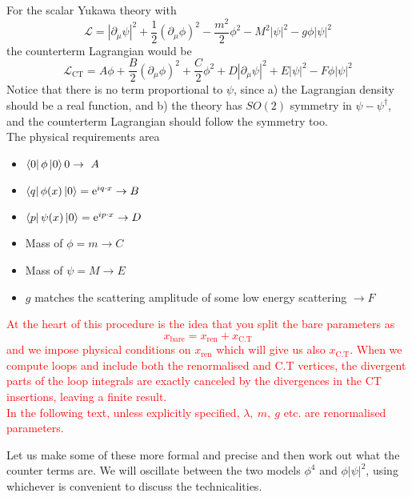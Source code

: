 \documentclass[11pt]{article}
\newcommand{\del}{\partial}
\newcommand{\e}{\mathrm{e}}
\newcommand{\ld}{\mathcal{L}}
\numberwithin{equation}{section}
\begin{document}
For the scalar Yukawa theory with 
\begin{equation*}
    \ld = |\del_\mu \psi|^2 + \frac{1}{2}(\del_\mu \phi)^2 - \frac{m^2}{2}\phi^2 - M^2|\psi|^2 - g\phi|\psi|^2
\end{equation*}
the counterterm Lagrangian would be 
\begin{equation*}
    \ld_{\text{CT}} = A\phi + \frac{B}{2}(\del_\mu \phi)^2 + \frac{C}{2}\phi^2 + D|\del_\mu \psi|^2  + E|\psi|^2 - F\phi|\psi|^2
\end{equation*}
Notice that there is no term proportional to \(\psi\), since a) the Lagrangian density should be a real function, and b) the theory has \(SO(2)\) symmetry in \(\psi-\psi^\dagger\), and the counterterm Lagrangian should follow the symmetry too.\\
The physical requirements area
\begin{itemize}
    \item \(\bra{0}\phi\ket{0} 0 \to~A\)
    \item \(\bra{q}\phi(x)\ket{0} = \e^{iq\cdot x} \to B\)
    \item \(\bra{p}\psi(x)\ket{0} = \e^{ip\cdot x} \to D\)
    \item Mass of \(\phi = m \to C\)
    \item Mass of \(\psi = M \to E\)
    \item \(g\) matches the scattering amplitude of some low energy scattering \(\to F\) 
\end{itemize}

\textcolor{red}{
    At the heart of this procedure is the idea that you split the bare parameters as 
    \begin{equation*}
        x_{\text{bare}} = x_{\text{ren}} + x_{\text{C.T}}
    \end{equation*}
    and we impose physical conditions on \(x_{\text{ren}}\) which will give us also \(x_{\text{C.T}}\). When we compute loops and include both the renormalised and C.T vertices, the divergent parts of the loop integrals are exactly canceled by the divergences in the CT insertions, leaving a finite result.\\
    In the following text, unless explicitly specified, \(\lambda,~m,~g\) etc. are renormalised parameters.\\
}

Let us make some of these more formal and precise and then work out what the counter terms are. We will oscillate between the two models \(\phi^4\) and \(\phi|\psi|^2\), using whichever is convenient to discuss the technicalities. 
\end{document}
